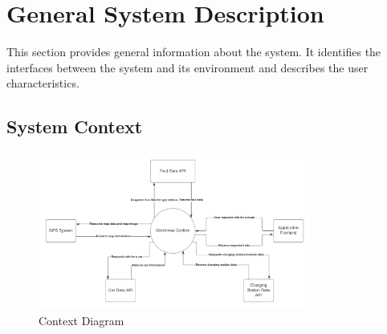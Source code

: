\documentclass[12pt]{article}
\begin{document}
\section{General System Description}

This section provides general information about the system.  It identifies the
interfaces between the system and its environment and describes the user
characteristics.

\subsection{System Context}

\begin{figure}[h!]
\begin{center}
 \includegraphics[width=0.8\textwidth]{ContextDiagram.png}
\caption{Context Diagram}
\label{Fig_SystemContext} 
\end{center}
\end{figure}
\end{document}

